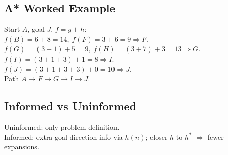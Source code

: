 \subsection*{A* Worked Example}
Start \(A\), goal \(J\). \( f=g+h \):\\
\( f(B)=6+8=14,\; f(F)=3+6=9 \Rightarrow F \).\\
\( f(G)=(3{+}1)+5=9,\; f(H)=(3{+}7)+3=13 \Rightarrow G \).\\
\( f(I)=(3{+}1{+}3)+1=8 \Rightarrow I \).\\
\( f(J)=(3{+}1{+}3{+}3)+0=10 \Rightarrow J \).\\
Path \( A\!\to\!F\!\to\!G\!\to\!I\!\to\!J \).

\subsection*{Informed vs Uninformed}
Uninformed: only problem definition.\\
Informed: extra goal-direction info via \(h(n)\); closer \(h\) to \(h^*\) \(\Rightarrow\) fewer expansions.
